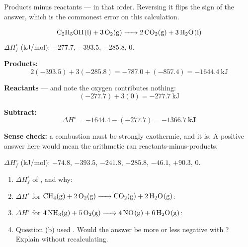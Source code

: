 \documentclass{apchem-worksheet}
\begin{document}
Products minus reactants --- in that order. Reversing it flips the sign
of the answer, which is the commonest error on this calculation.

\begin{workedexample}
\[ \ce{C2H5OH(l) + 3O2(g) -> 2CO2(g) + 3H2O(l)} \]
$\Delta H_f^\circ$ (kJ/mol):  $-277.7$,
 $-393.5$,  $-285.8$,  $0$.

\textbf{Products:}
\[ 2(-393.5) + 3(-285.8) = -787.0 + (-857.4) = \SI{-1644.4}{\kilo\joule} \]

\textbf{Reactants} --- and note the oxygen contributes nothing:
\[ (-277.7) + 3(0) = \SI{-277.7}{\kilo\joule} \]

\textbf{Subtract:}
\[ \Delta H^\circ = -1644.4 - (-277.7) = \mathbf{-1366.7~kJ} \]

\textbf{Sense check:} a combustion must be strongly exothermic, and it
is. A positive answer here would mean the arithmetic ran
reactants-minus-products.
\end{workedexample}

\begin{yourturn}
$\Delta H_f^\circ$ (kJ/mol):  $-74.8$,  $-393.5$,
 $-241.8$,  $-285.8$,  $-46.1$,
 $+90.3$,  $0$.
\begin{enumerate}[leftmargin=*,itemsep=0.5em]
  \item $\Delta H_f^\circ$ of , and why: \workspace[1.2cm]
  \item $\Delta H^\circ$ for
        $\ce{CH4(g) + 2O2(g) -> CO2(g) + 2H2O(g)}$: \workspace[2cm]
  \item $\Delta H^\circ$ for
        $\ce{4NH3(g) + 5O2(g) -> 4NO(g) + 6H2O(g)}$: \workspace[2.2cm]
  \item Question (b) used . Would the answer be more or less
        negative with ? Explain without recalculating.
        \workspace[1.6cm]
\end{enumerate}
\end{yourturn}
\end{document}
